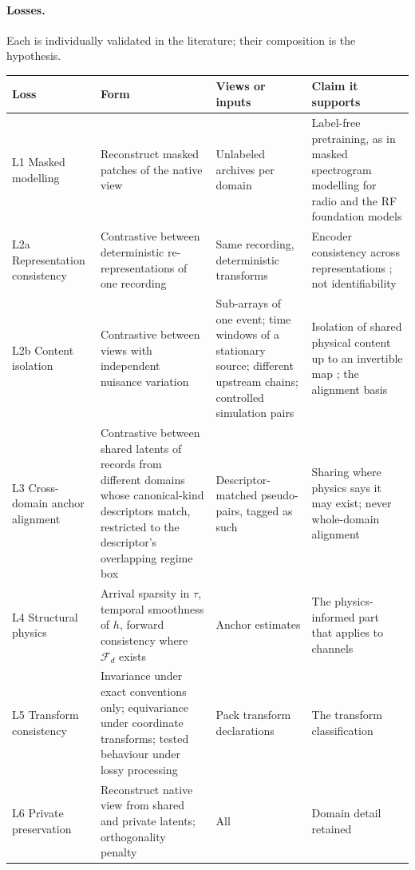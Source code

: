 \documentclass[11pt,a4paper]{article}
\begin{document}
\paragraph{Losses.} Each is individually validated in the literature; their composition is the hypothesis.
\begin{center}\small
\begin{tabular}{@{}p{2.8cm}p{3.4cm}p{3.8cm}p{4.2cm}@{}}
\toprule
Loss & Form & Views or inputs & Claim it supports \\
\midrule
L1 Masked modelling & Reconstruct masked patches of the native view & Unlabeled archives per domain & Label-free pretraining, as in masked spectrogram modelling for radio and the RF foundation models \\
L2a Representation consistency & Contrastive between deterministic re-representations of one recording & Same recording, deterministic transforms & Encoder consistency across representations \citep{jiang2026}; not identifiability \\
L2b Content isolation & Contrastive between views with independent nuisance variation & Sub-arrays of one event; time windows of a stationary source; different upstream chains; controlled simulation pairs & Isolation of shared physical content up to an invertible map \citep{vonkugelgen2021,gresele2020}; the alignment basis \\
L3 Cross-domain anchor alignment & Contrastive between shared latents of records from different domains whose canonical-kind descriptors match, restricted to the descriptor's overlapping regime box & Descriptor-matched pseudo-pairs, tagged as such & Sharing where physics says it may exist; never whole-domain alignment \citep{zhao2019} \\
L4 Structural physics & Arrival sparsity in $\tau$, temporal smoothness of $h$, forward consistency where $\mathcal F_d$ exists & Anchor estimates & The physics-informed part that applies to channels \citep{zubow2026,sabra2004} \\
L5 Transform consistency & Invariance under exact conventions only; equivariance under coordinate transforms; tested behaviour under lossy processing & Pack transform declarations & The transform classification \\
L6 Private preservation & Reconstruct native view from shared and private latents; orthogonality penalty & All & Domain detail retained \citep{bousmalis2016} \\
\bottomrule
\end{tabular}
\end{center}
\end{document}
